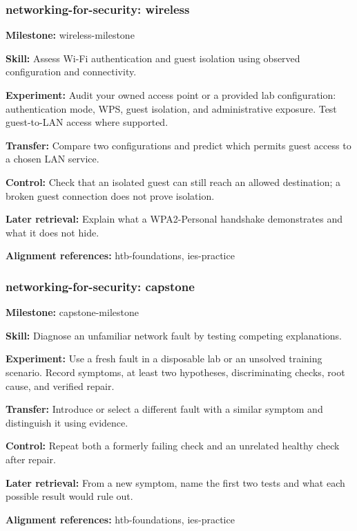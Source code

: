 \subsubsection{networking-for-security: wireless}
\noindent\textbf{Milestone:} wireless-milestone\par
\noindent\textbf{Skill:} Assess Wi-Fi authentication and guest isolation using observed configuration and connectivity.\par
\noindent\textbf{Experiment:} Audit your owned access point or a provided lab configuration: authentication mode, WPS, guest isolation, and administrative exposure. Test guest-to-LAN access where supported.\par
\noindent\textbf{Transfer:} Compare two configurations and predict which permits guest access to a chosen LAN service.\par
\noindent\textbf{Control:} Check that an isolated guest can still reach an allowed destination; a broken guest connection does not prove isolation.\par
\noindent\textbf{Later retrieval:} Explain what a WPA2-Personal handshake demonstrates and what it does not hide.\par
\noindent\textbf{Alignment references:} htb-foundations, ies-practice\par
\subsubsection{networking-for-security: capstone}
\noindent\textbf{Milestone:} capstone-milestone\par
\noindent\textbf{Skill:} Diagnose an unfamiliar network fault by testing competing explanations.\par
\noindent\textbf{Experiment:} Use a fresh fault in a disposable lab or an unsolved training scenario. Record symptoms, at least two hypotheses, discriminating checks, root cause, and verified repair.\par
\noindent\textbf{Transfer:} Introduce or select a different fault with a similar symptom and distinguish it using evidence.\par
\noindent\textbf{Control:} Repeat both a formerly failing check and an unrelated healthy check after repair.\par
\noindent\textbf{Later retrieval:} From a new symptom, name the first two tests and what each possible result would rule out.\par
\noindent\textbf{Alignment references:} htb-foundations, ies-practice\par
